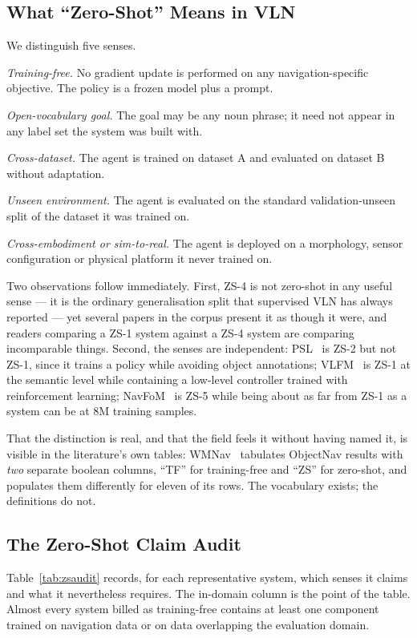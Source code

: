 \documentclass[journal]{IEEEtran}
\begin{document}
\subsection{What ``Zero-Shot'' Means in VLN}\label{sec:zs-defs}
We distinguish five senses.

\begin{IEEEdescription}[\IEEEsetlabelwidth{ZS-5}]
\item[ZS-1] \emph{Training-free.} No gradient update is performed on any
navigation-specific objective. The policy is a frozen model plus a prompt.
\item[ZS-2] \emph{Open-vocabulary goal.} The goal may be any noun phrase;
it need not appear in any label set the system was built with.
\item[ZS-3] \emph{Cross-dataset.} The agent is trained on dataset A and
evaluated on dataset B without adaptation.
\item[ZS-4] \emph{Unseen environment.} The agent is evaluated on the
standard validation-unseen split of the dataset it was trained on.
\item[ZS-5] \emph{Cross-embodiment or sim-to-real.} The agent is deployed on
a morphology, sensor configuration or physical platform it never trained on.
\end{IEEEdescription}

Two observations follow immediately. First, ZS-4 is not zero-shot in any
useful sense --- it is the ordinary generalisation split that supervised VLN
has always reported --- yet several papers in the corpus present it as
though it were, and readers comparing a ZS-1 system against a ZS-4 system
are comparing incomparable things. Second, the senses are independent:
PSL~\cite{sun2024prioritized} is ZS-2 but not ZS-1, since it trains a policy
while avoiding object annotations; VLFM~\cite{yokoyama2024vlfm} is ZS-1 at
the semantic level while containing a low-level controller trained with
reinforcement learning; NavFoM~\cite{zhang2025embodied} is ZS-5 while being
about as far from ZS-1 as a system can be at 8M training samples.

That the distinction is real, and that the field feels it without having
named it, is visible in the literature's own tables:
WMNav~\cite{nie2025wmnav} tabulates ObjectNav results with \emph{two}
separate boolean columns, ``TF'' for training-free and ``ZS'' for
zero-shot, and populates them differently for eleven of its rows. The
vocabulary exists; the definitions do not.

\subsection{The Zero-Shot Claim Audit}
Table~\ref{tab:zsaudit} records, for each representative system, which
senses it claims and what it nevertheless requires. The
in-domain column is the point of the table. Almost every system billed as
training-free contains at least one component trained on navigation data or
on data overlapping the evaluation domain.
\end{document}
